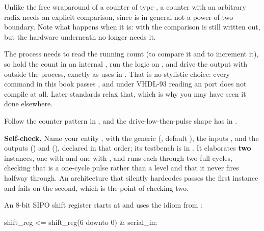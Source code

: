 Unlike the free wraparound of a counter of type , a counter with an
arbitrary radix needs an explicit comparison, since  is in general not a power-of-two
boundary. Note what happens when it is: with  the comparison is still written out,
but the hardware underneath no longer needs it.

\note[Hint]The process needs to read the running count (to compare it and to increment it), so hold
the count in an internal , run the logic on
, and drive the output with  outside the process, exactly as
 uses  in . That is no stylistic choice: every
 command in this book passes , and under VHDL-93 reading an 
port does not compile at all. Later standards relax that, which is why you may have seen it done
elsewhere.

Follow the counter pattern in , and the drive-low-then-pulse shape
 has in .


\begin{selfcheck}
\textbf{Self-check.} Name your entity , with the generic 
(, default ), the inputs ,  and
the outputs  () and  (),
declared in that order; its testbench is in . It elaborates \textbf{two}
instances, one with  and one with , and runs each through two full
cycles, checking that  is a one-cycle pulse rather than a level and that it never fires
halfway through. An architecture that silently hardcodes  passes the first instance and
fails on the second, which is the point of checking two.
\end{selfcheck}


\label{c6:ex:sipotrace}
An 8-bit SIPO shift register starts at  and uses the idiom from
:

\begin{vhdlcode}
shift_reg <= shift_reg(6 downto 0) & serial_in;
\end{vhdlcode}


